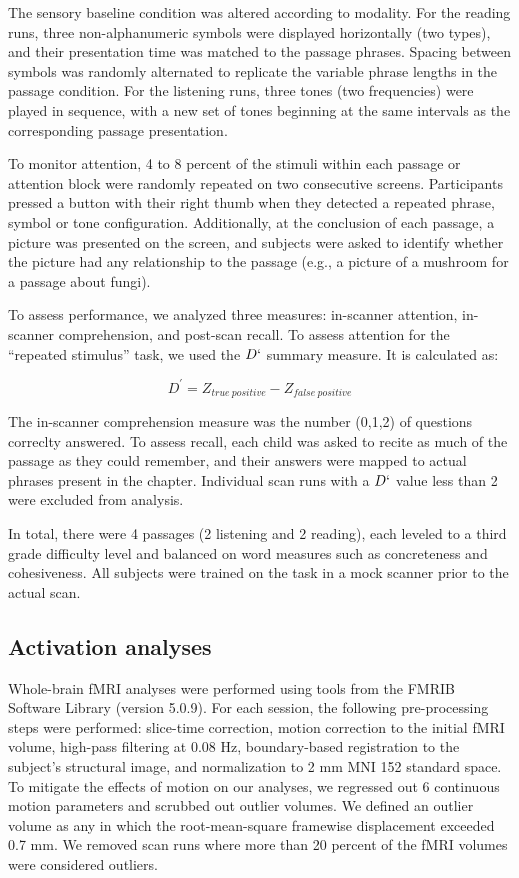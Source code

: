 The sensory baseline condition was altered according to modality. For the reading runs, three non-alphanumeric symbols were displayed horizontally (two types), and their presentation time was matched to the passage phrases. Spacing between symbols was randomly alternated to replicate the variable phrase lengths in the passage condition. For the listening runs, three tones (two frequencies) were played in sequence, with a new set of tones beginning at the same intervals as the corresponding passage presentation. 

To monitor attention, 4 to 8 percent of the stimuli within each passage or attention block were randomly repeated on two consecutive screens.  Participants pressed a button with their right thumb when they detected a repeated phrase, symbol or tone configuration. Additionally, at the conclusion of each passage, a picture was presented on the screen, and subjects were asked to identify whether the picture had any relationship to the passage (e.g., a picture of a mushroom for a passage about fungi). 

To assess performance, we analyzed three measures: in-scanner attention, in-scanner comprehension, and post-scan recall. To assess attention for the ``repeated stimulus'' task, we used the $D`$ summary measure. It is calculated as:

$$
D^\prime = Z_{true\ positive} - Z_{false\ positive}
$$

The in-scanner comprehension measure was the number (0,1,2) of questions correclty answered. To assess recall, each child was asked to recite as much of the passage as they could remember, and their answers were mapped to actual phrases present in the chapter. Individual scan runs with a $D`$ value less than 2 were excluded from analysis.

In total, there were 4 passages (2 listening and 2 reading), each leveled to a third grade difficulty level and balanced on word measures such as concreteness and cohesiveness.  All subjects were trained on the task in a mock scanner prior to the actual scan. 


\subsection{Activation analyses}

Whole-brain fMRI analyses were performed using tools from the FMRIB Software Library (version 5.0.9). For each session, the following pre-processing steps were performed:  slice-time correction, motion correction to the initial fMRI volume, high-pass filtering at 0.08 Hz, boundary-based registration to the subject's structural image, and normalization to 2 mm MNI 152 standard space. To mitigate the effects of motion on our analyses, we regressed out 6 continuous motion parameters and scrubbed out outlier volumes. We defined an outlier volume as any in which the root-mean-square framewise displacement exceeded 0.7 mm. We removed scan runs where more than 20 percent of the fMRI volumes were considered outliers.

